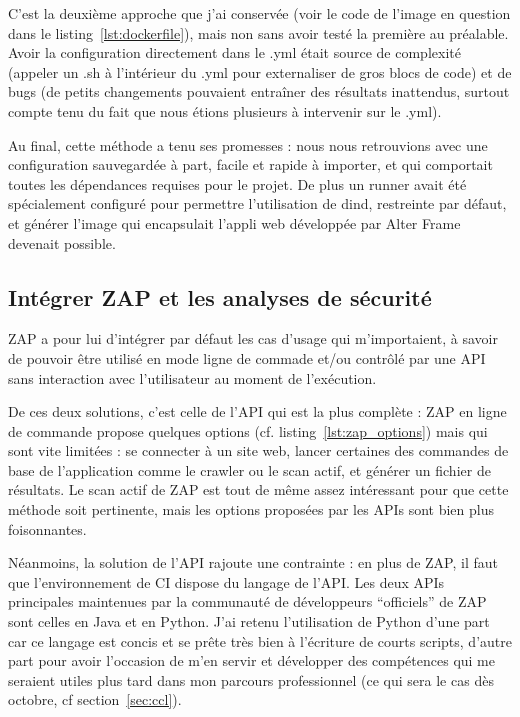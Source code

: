 C'est la deuxième approche que j'ai conservée (voir le code de l'image en question dans le listing~\ref{lst:dockerfile}), mais non sans avoir testé la première au préalable. Avoir la configuration directement dans le .yml était source de complexité (appeler un .sh à l'intérieur du .yml pour externaliser de gros blocs de code) et de bugs (de petits changements pouvaient entraîner des résultats inattendus, surtout compte tenu du fait que nous étions plusieurs à intervenir sur le .yml).

Au final, cette méthode a tenu ses promesses : nous nous retrouvions avec une configuration sauvegardée à part, facile et rapide à importer, et qui comportait toutes les dépendances requises pour le projet. De plus un runner avait été spécialement configuré pour permettre l'utilisation de dind, restreinte par défaut, et générer l'image qui encapsulait l'appli web développée par Alter Frame devenait possible.

\subsection{Intégrer ZAP et les analyses de sécurité}
ZAP a pour lui d'intégrer par défaut les cas d'usage qui m'importaient, à savoir de pouvoir être utilisé en mode ligne de commade et/ou contrôlé par une API sans interaction avec l'utilisateur au moment de l'exécution.

De ces deux solutions, c'est celle de l'API qui est la plus complète : ZAP en ligne de commande propose quelques options (cf. listing~\ref{lst:zap_options}) mais qui sont vite limitées : se connecter à un site web, lancer certaines des commandes de base de l'application comme le crawler ou le scan actif, et générer un fichier de résultats. Le scan actif de ZAP est tout de même assez intéressant pour que cette méthode soit pertinente, mais les options proposées par les APIs sont bien plus foisonnantes.

Néanmoins, la solution de l'API rajoute une contrainte : en plus de ZAP, il faut que l'environnement de CI dispose du langage de l'API. Les deux APIs principales maintenues par la communauté de développeurs ``officiels'' de ZAP sont celles en Java et en Python. J'ai retenu l'utilisation de Python d'une part car ce langage est concis et se prête très bien à l'écriture de courts scripts, d'autre part pour avoir l'occasion de m'en servir et développer des compétences qui me seraient utiles plus tard dans mon parcours professionnel (ce qui sera le cas dès octobre, cf section~\ref{sec:ccl}).


